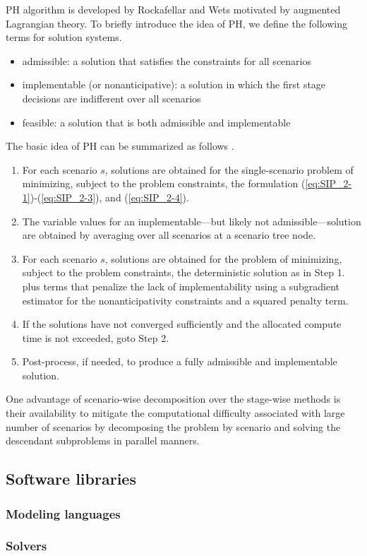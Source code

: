 PH algorithm is developed by Rockafellar and Wets motivated by augmented Lagrangian theory. To briefly introduce the idea of PH, we define the following terms for solution systems.
\begin{itemize}
	\item admissible: a solution that satisfies the constraints for all scenarios
	\item implementable (or nonanticipative): a solution in which the first stage decisions are indifferent over all scenarios
	\item feasible: a solution that is both admissible and implementable
\end{itemize}
The basic idea of PH can be summarized as follows \cite{book:pyomo}.
\begin{enumerate}
	\item For each scenario $s$, solutions are obtained for the single-scenario problem of minimizing, subject to the problem constraints, the formulation (\ref{eq:SIP_2-1})-(\ref{eq:SIP_2-3}), and (\ref{eq:SIP_2-4}).
	\item The variable values for an implementable---but likely not admissible---solution are obtained by averaging over all scenarios at a scenario tree node.
	\item For each scenario $s$, solutions are obtained for the problem of minimizing, subject to the problem constraints, the deterministic solution as in Step 1. plus terms that penalize the lack of implementability using a subgradient estimator for the nonanticipativity constraints and a squared penalty term.
	\item If the solutions have not converged sufficiently and the allocated compute time is not exceeded, goto Step 2.
	\item Post-process, if needed, to produce a fully admissible and implementable solution.
\end{enumerate}

One advantage of scenario-wise decomposition over the stage-wise methods is their availability to mitigate the computational difficulty associated with large number of scenarios by decomposing the problem by scenario and solving the descendant subproblems in parallel manners.



\subsection{Software libraries}
\subsubsection{Modeling languages}
\subsubsection{Solvers}
